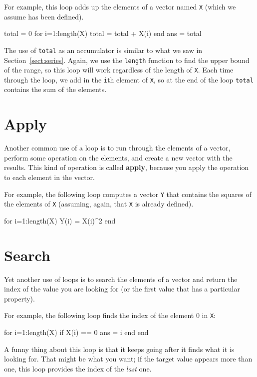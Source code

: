 \documentclass[
]{book}
\numberwithin{Answer}{chapter}
\numberwithin{Exercise}{chapter}
\begin{document}
For example, this loop adds up the elements of a vector named {\tt X}
(which we assume has been defined).

\begin{code}
total = 0
for i=1:length(X)
    total = total + X(i)
end
ans = total
\end{code}

The use of {\tt total} as an accumulator is similar to what we
saw in Section~\ref{sect:series}.  Again, we use the {\tt length} function
to find the upper bound of the range, so this loop will work
regardless of the length of {\tt X}.
Each time through the loop, we add
in the {\tt i}th element of {\tt X}, so at the end of the loop
{\tt total} contains the sum of the elements.



\section{Apply}
\label{sect:apply}

Another common use of a loop is to run through the elements of
a vector, perform some operation on the elements, and create
a new vector with the results.  This kind of operation is called
{\bf apply}, because you apply the operation to each element in
the vector.

For example, the following loop computes a vector {\tt Y} that
contains the squares of the elements of {\tt X} (assuming, again,
that {\tt X} is already defined).

\begin{code}
for i=1:length(X)
    Y(i) = X(i)^2
end
\end{code}


\section{Search}
\label{sect:search}

Yet another use of loops is to search the elements of a vector
and return the index of the value you are looking for (or the
first value that has a particular property).  

For example, the following loop finds the index of the element 0 in {\tt X}:

\begin{code}
for i=1:length(X)
    if X(i) == 0
        ans = i
    end
end
\end{code}

A funny thing about this loop is that it keeps going after it
finds what it is looking for.  That might be what you want; if the
target value appears more than one, this loop provides the index
of the {\em last} one.
\end{document}
